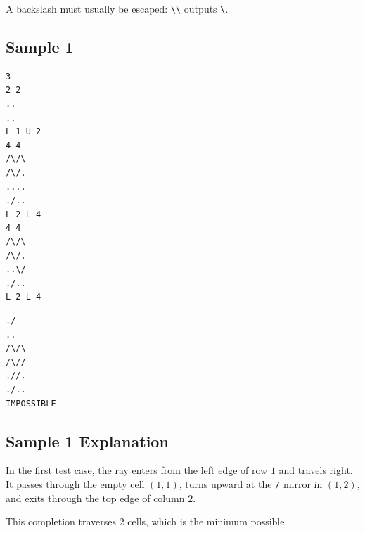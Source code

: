 A backslash must usually be escaped: \texttt{\textbackslash\textbackslash} outputs \texttt{\textbackslash}.

\subsection{Sample 1}

\begin{minipage}{\linewidth}
	\begin{minipage}[t]{0.49\linewidth}
		\begin{lstlisting}[title=\texttt{standard input}]
3
2 2
..
..
L 1 U 2
4 4
/\/\
/\/.
....
./..
L 2 L 4
4 4
/\/\
/\/.
..\/
./..
L 2 L 4
\end{lstlisting}
	\end{minipage}
	\begin{minipage}[t]{0.49\linewidth}
		\begin{lstlisting}[title=\texttt{standard output}]
./
..
/\/\
/\//
.//.
./..
IMPOSSIBLE
\end{lstlisting}
	\end{minipage}
\end{minipage}


\subsection{Sample 1 Explanation}

In the first test case, the ray enters from the left edge of row $1$ and travels right. It passes through the empty cell $(1,1)$, turns upward at the \texttt{/} mirror in $(1,2)$, and exits through the top edge of column $2$.

This completion traverses $2$ cells, which is the minimum possible.
